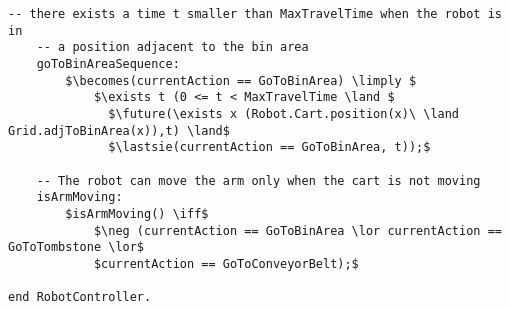 \begin{lstlisting}[fontadjust, mathescape, frame=single]
    -- there exists a time t smaller than MaxTravelTime when the robot is in 
    -- a position adjacent to the bin area
    goToBinAreaSequence:
        $\becomes(currentAction == GoToBinArea) \limply $
            $\exists t (0 <= t < MaxTravelTime \land $
              $\future(\exists x (Robot.Cart.position(x)\ \land Grid.adjToBinArea(x)),t) \land$
              $\lastsie(currentAction == GoToBinArea, t));$
                      
    -- The robot can move the arm only when the cart is not moving
    isArmMoving: 
        $isArmMoving() \iff$
            $\neg (currentAction == GoToBinArea \lor currentAction == GoToTombstone \lor$
            $currentAction == GoToConveyorBelt);$
         
end RobotController.
\end{lstlisting}

